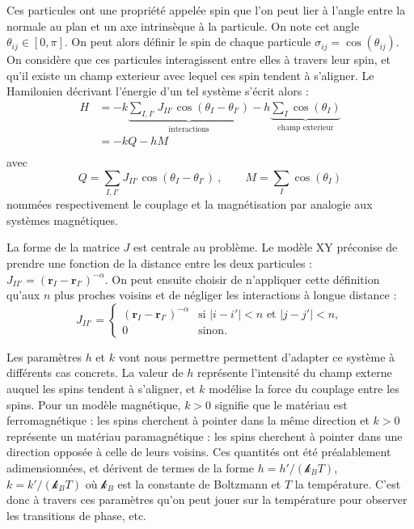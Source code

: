 \documentclass[a4paper, openany, 11pt]{article}
\newcommand{\vr}{\bm{r}}
\newcommand{\kb}{\mathcal{k}_B}
\begin{document}
Ces particules ont une propriété appelée spin que l'on peut lier à l'angle entre la normale au plan
et un axe intrinsèque à la particule. On note cet angle $\theta_{ij} \in [0, \pi]$. On peut alors
définir le spin de chaque particule $\sigma_{ij} = \cos(\theta_{ij})$. On considère que ces
particules interagissent entre elles à travers leur spin, et qu'il existe un champ exterieur avec
lequel ces spin tendent à s'aligner. Le Hamilonien décrivant l'énergie d'un tel système s'écrit
alors : 
\begin{equation}
    \begin{aligned}  
        H &= - k \underbrace{\sum_{I, I'} J_{II'} \cos(\theta_I-\theta_{I'})}_{\text{interactions}} 
        - h \underbrace{\sum_I \cos(\theta_I) }_{\text{champ exterieur}} \\
          &= -k Q - h M \\
    \end{aligned}
\end{equation}
avec
\begin{equation}
    Q = \sum_{I, I'} J_{II'} \cos(\theta_I-\theta_{I'})~, \qquad M = \sum_I \cos(\theta_I) 
\end{equation}
nommées respectivement le couplage et la magnétisation par analogie aux systèmes magnétiques.

La forme de la matrice $J$ est centrale au problème. Le modèle XY préconise de prendre une fonction
de la distance entre les deux particules : $J_{II'} = (\vr_I - \vr_{I'})^{-\alpha}$. On peut ensuite
choisir de n'appliquer cette définition qu'aux $n$ plus proches voisins et de négliger les
interactions à longue distance : 
\begin{equation}
    J_{II'} = 
    \begin{cases}
        (\vr_I - \vr_{I'})^{-\alpha} & \text{si~} |i-i'|<n \text{~et~} |j-j'|<n, \\
        0 & \text{sinon.}
    \end{cases}
\end{equation}

Les paramètres $h$ et $k$ vont nous permettre permettent d'adapter ce système à différents cas
concrets. La valeur de $h$ représente l'intensité du champ externe auquel les spins tendent à
s'aligner, et $k$ modélise la force du couplage entre les spins. Pour un modèle magnétique, $k>0$
signifie que le matériau est ferromagnétique : les spins cherchent à pointer dans la même direction
et $k>0$ représente un matériau paramagnétique : les spins cherchent à pointer dans une direction
opposée à celle de leurs voisins. Ces quantités ont été préalablement adimensionnées, et dérivent de
termes de la forme $h=h'/(\kb T)$, $k = k'/(\kb T)$ où $\kb$ est la constante de Boltzmann et $T$ la
température. C'est donc à travers ces paramètres qu'on peut jouer sur la température pour observer
les transitions de phase, etc. 
\end{document}

